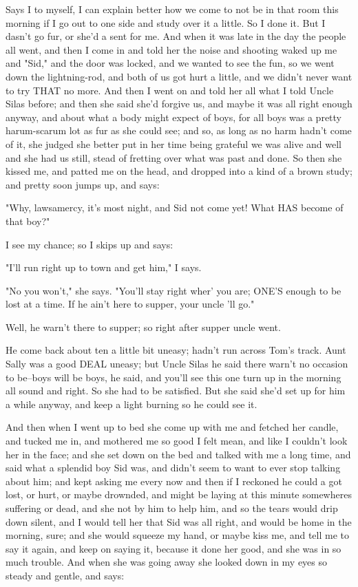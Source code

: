 Says I to myself, I can explain better how we come to not be in that room
this morning if I go out to one side and study over it a little.  So I
done it.  But I dasn't go fur, or she'd a sent for me.  And when it was
late in the day the people all went, and then I come in and told her the
noise and shooting waked up me and "Sid," and the door was locked, and we
wanted to see the fun, so we went down the lightning-rod, and both of us
got hurt a little, and we didn't never want to try THAT no more.  And
then I went on and told her all what I told Uncle Silas before; and then
she said she'd forgive us, and maybe it was all right enough anyway, and
about what a body might expect of boys, for all boys was a pretty
harum-scarum lot as fur as she could see; and so, as long as no harm
hadn't come of it, she judged she better put in her time being grateful
we was alive and well and she had us still, stead of fretting over what
was past and done.  So then she kissed me, and patted me on the head, and
dropped into a kind of a brown study; and pretty soon jumps up, and says:

"Why, lawsamercy, it's most night, and Sid not come yet!  What HAS become
of that boy?"

I see my chance; so I skips up and says:

"I'll run right up to town and get him," I says.

"No you won't," she says.  "You'll stay right wher' you are; ONE'S enough
to be lost at a time.  If he ain't here to supper, your uncle 'll go."

Well, he warn't there to supper; so right after supper uncle went.

He come back about ten a little bit uneasy; hadn't run across Tom's
track. Aunt Sally was a good DEAL uneasy; but Uncle Silas he said there
warn't no occasion to be--boys will be boys, he said, and you'll see this
one turn up in the morning all sound and right.  So she had to be
satisfied.  But she said she'd set up for him a while anyway, and keep a
light burning so he could see it.

And then when I went up to bed she come up with me and fetched her
candle, and tucked me in, and mothered me so good I felt mean, and like I
couldn't look her in the face; and she set down on the bed and talked
with me a long time, and said what a splendid boy Sid was, and didn't
seem to want to ever stop talking about him; and kept asking me every now
and then if I reckoned he could a got lost, or hurt, or maybe drownded,
and might be laying at this minute somewheres suffering or dead, and she
not by him to help him, and so the tears would drip down silent, and I
would tell her that Sid was all right, and would be home in the morning,
sure; and she would squeeze my hand, or maybe kiss me, and tell me to say
it again, and keep on saying it, because it done her good, and she was in
so much trouble.  And when she was going away she looked down in my eyes
so steady and gentle, and says:

